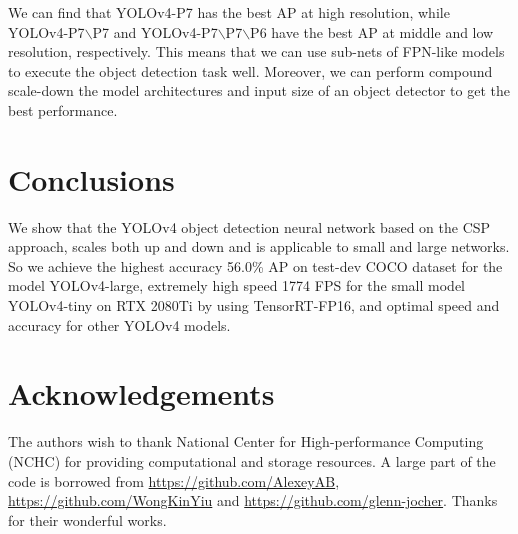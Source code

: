 \documentclass[10pt,twocolumn,letterpaper]{article}
\begin{document}
We can find that YOLOv4-P7 has the best AP at high resolution, while YOLOv4-P7$\backslash$P7 and YOLOv4-P7$\backslash$P7$\backslash$P6 have the best AP at middle and low resolution, respectively. This means that we can use sub-nets of FPN-like models to execute the object detection task well. Moreover, we can perform compound scale-down the model architectures and input size of an object detector to get the best performance.

\section{Conclusions}

We show that the YOLOv4 object detection neural network based on the CSP approach, scales both up and down and is applicable to small and large networks. So we achieve the highest accuracy 56.0\% AP on test-dev COCO dataset for the model YOLOv4-large, extremely high speed 1774 FPS for the small model YOLOv4-tiny on RTX 2080Ti by using TensorRT-FP16, and optimal speed and accuracy for other YOLOv4 models.

\vspace{6mm}

\section{Acknowledgements}

The authors wish to thank National Center for High-performance Computing (NCHC) for
providing computational and storage resources. A large part of the code is borrowed from \url{https://github.com/AlexeyAB}, \url{https://github.com/WongKinYiu} and \url{https://github.com/glenn-jocher}. Thanks for their wonderful works.
\end{document}
